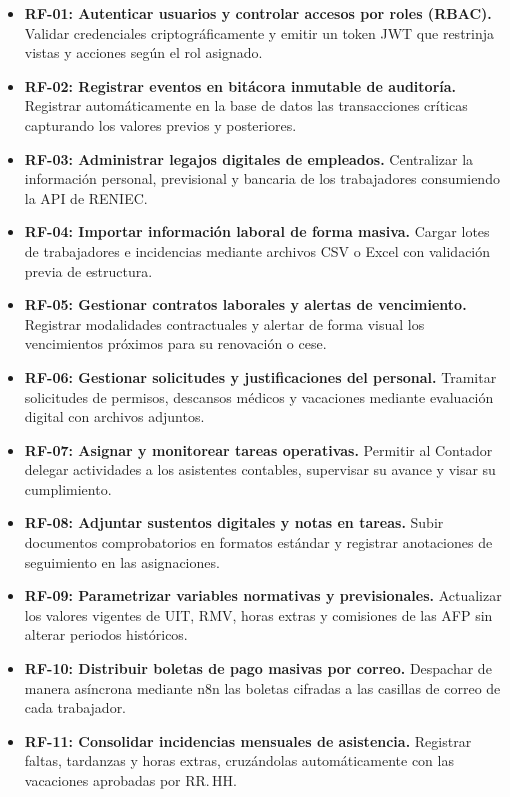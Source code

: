 \begin{itemize}
    \item \textbf{RF-01: Autenticar usuarios y controlar accesos por roles (RBAC).} Validar credenciales criptográficamente y emitir un token JWT que restrinja vistas y acciones según el rol asignado.
    \item \textbf{RF-02: Registrar eventos en bitácora inmutable de auditoría.} Registrar automáticamente en la base de datos las transacciones críticas capturando los valores previos y posteriores.
    \item \textbf{RF-03: Administrar legajos digitales de empleados.} Centralizar la información personal, previsional y bancaria de los trabajadores consumiendo la API de RENIEC.
    \item \textbf{RF-04: Importar información laboral de forma masiva.} Cargar lotes de trabajadores e incidencias mediante archivos CSV o Excel con validación previa de estructura.
    \item \textbf{RF-05: Gestionar contratos laborales y alertas de vencimiento.} Registrar modalidades contractuales y alertar de forma visual los vencimientos próximos para su renovación o cese.
    \item \textbf{RF-06: Gestionar solicitudes y justificaciones del personal.} Tramitar solicitudes de permisos, descansos médicos y vacaciones mediante evaluación digital con archivos adjuntos.
    \item \textbf{RF-07: Asignar y monitorear tareas operativas.} Permitir al Contador delegar actividades a los asistentes contables, supervisar su avance y visar su cumplimiento.
    \item \textbf{RF-08: Adjuntar sustentos digitales y notas en tareas.} Subir documentos comprobatorios en formatos estándar y registrar anotaciones de seguimiento en las asignaciones.
    \item \textbf{RF-09: Parametrizar variables normativas y previsionales.} Actualizar los valores vigentes de UIT, RMV, horas extras y comisiones de las AFP sin alterar periodos históricos.
    \item \textbf{RF-10: Distribuir boletas de pago masivas por correo.} Despachar de manera asíncrona mediante n8n las boletas cifradas a las casillas de correo de cada trabajador.
    \item \textbf{RF-11: Consolidar incidencias mensuales de asistencia.} Registrar faltas, tardanzas y horas extras, cruzándolas automáticamente con las vacaciones aprobadas por RR.\,HH.

\end{itemize}
